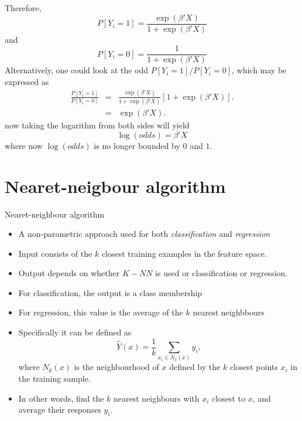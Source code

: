 \documentclass{beamer}
\begin{document}
\begin{frame}
Therefore,
\[
P[Y_i=1]=\frac{\exp(\beta'X)}{1+\exp(\beta'X)}
\]
and
\[
P[Y_i=0]=\frac{1}{1+\exp(\beta'X)}
\]
Alternatively, one could look at the odd $P[Y_i=1]/P[Y_i=0]$, which may be expressed as
\begin{eqnarray*}
\frac{P[Y_i=1]}{P[Y_i=0]}&=&\frac{\exp(\beta'X)}{1+\exp(\beta'X)}[1+\exp(\beta'X)].\\
&=&\exp(\beta'X).
\end{eqnarray*}
now taking the logarithm from both sides will yield
\begin{equation}
\log(odds)=\beta'X
\end{equation}
where now $\log(odds)$ is no longer bounded by $0$ and $1$.
\end{frame}
\section{Nearet-neigbour algorithm}
\begin{frame}{Nearet-neighbour algorithm}
\begin{itemize}
\item{} A non-parametric approach used for both \textit{classification} and \textit{regression}
\item{} Input consists of the $k$ closest training examples in the feature space.
\item{} Output depends on whether $K-NN$ is used or classification or regression.
\item{} For classification, the output is a class membership
\item{} For regression, this value is the average of the $k$ nearest neighbbours
\item{} Specifically it can be defined as
\begin{equation}
\hat{Y}(x)=\frac{1}{k}\sum\limits_{x_i\in N_k(x)}y_i,
\end{equation}
where $N_k(x)$ is the neighbourhood of $x$ defined by the $k$ closest points $x_i$ in the training sample.
\item{} In other words, find the $k$ nearest neighbours with $x_i$ closest to $x$, and average their responses $y_i$.
\end{itemize}
\end{frame}
\end{document}
